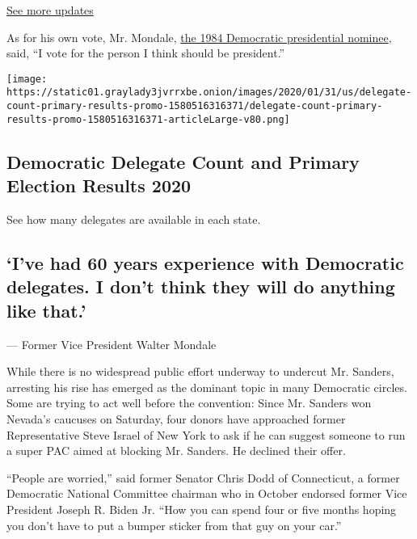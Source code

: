 \href{https://www.nytimes3xbfgragh.onion/live/2020/08/19/us/dnc-convention-election?action=click\&pgtype=Article\&state=default\&region=MAIN_CONTENT_1\&context=storylines_live_updates}{See
more updates}

As for his own vote, Mr. Mondale,
\href{https://www.nytimes3xbfgragh.onion/1984/07/20/us/transcript-of-mondale-address-accepting-party-nomination.html}{the
1984 Democratic presidential nominee}, said, ``I vote for the person I
think should be president.''

\href{https://www.nytimes3xbfgragh.onion/interactive/2020/us/elections/delegate-count-primary-results.html}{}

\texttt{[image: https://static01.graylady3jvrrxbe.onion/images/2020/01/31/us/delegate-count-primary-results-promo-1580516316371/delegate-count-primary-results-promo-1580516316371-articleLarge-v80.png]}

\hypertarget{democratic-delegate-count-and-primary-election-results-2020}{%
\subsection{Democratic Delegate Count and Primary Election Results
2020}\label{democratic-delegate-count-and-primary-election-results-2020}}

See how many delegates are available in each state.

\hypertarget{ive-had-60-years-experience-with-democratic-delegates-i-dont-think-they-will-do-anything-like-that}{%
\subsection{`I've had 60 years experience with Democratic delegates. I
don't think they will do anything like
that.'}\label{ive-had-60-years-experience-with-democratic-delegates-i-dont-think-they-will-do-anything-like-that}}

--- Former Vice President Walter Mondale

While there is no widespread public effort underway to undercut Mr.
Sanders, arresting his rise has emerged as the dominant topic in many
Democratic circles. Some are trying to act well before the convention:
Since Mr. Sanders won Nevada's caucuses on Saturday, four donors have
approached former Representative Steve Israel of New York to ask if he
can suggest someone to run a super PAC aimed at blocking Mr. Sanders. He
declined their offer.

``People are worried,'' said former Senator Chris Dodd of Connecticut, a
former Democratic National Committee chairman who in October endorsed
former Vice President Joseph R. Biden Jr. ``How you can spend four or
five months hoping you don't have to put a bumper sticker from that guy
on your car.''

